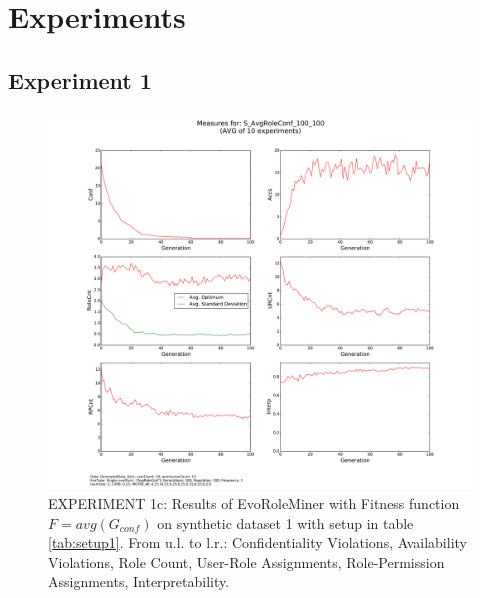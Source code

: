 \newpage
\section{Experiments}
\label{sec:AppendixB}

\subsection{Experiment 1}
\label{sec:experiment1}
    \begin{figure}[H]
        \centering
        \includegraphics[scale=0.33, trim=4cm 2cm 4cm 0cm, clip=true]{./Figures/exp1avgConf}
        \caption{EXPERIMENT 1c: Results of EvoRoleMiner with Fitness function $F=avg(G_{conf})$ on synthetic dataset 1 with setup in table \ref{tab:setup1}. From u.l. to l.r.: Confidentiality Violations, Availability Violations, Role Count, User-Role Assignments, Role-Permission Assignments, Interpretability.}
        \label{fig:exp1avgConf}
    \end{figure}
    
